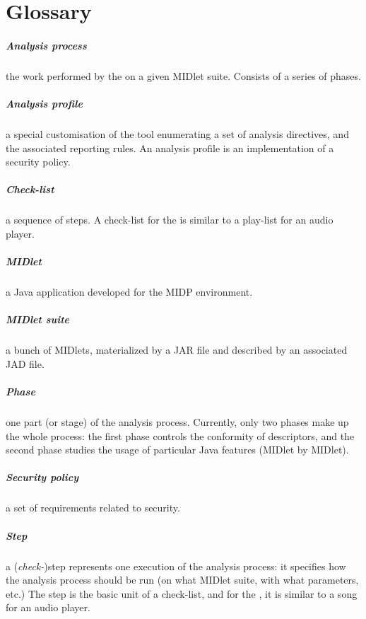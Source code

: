 \chapter*{Glossary}

\paragraph{Analysis process} the work performed by the \ma on a given
MIDlet suite. Consists of a series of phases.
\paragraph{Analysis profile} a special customisation of the tool
enumerating a set of analysis directives, and the associated reporting
rules. An analysis profile is an implementation of a security policy.
\paragraph{Check-list} a sequence of steps.  A check-list for the \ma
is similar to a play-list for an audio player. 
\paragraph{MIDlet} a Java application developed for the MIDP environment.
\paragraph{MIDlet suite} a bunch of MIDlets, materialized by a JAR
file and described by an associated JAD file.
\paragraph{Phase} one part (or stage) of the analysis
process. Currently, only two phases make up the whole process: the
first phase controls the conformity of descriptors, and the second
phase studies the usage of particular Java features (MIDlet by MIDlet).
\paragraph{Security policy} a set of requirements related to security.
\paragraph{Step} a (\emph{check-})step represents one execution of the
analysis process: it specifies how the analysis process
should be run (on what MIDlet suite, with what parameters, etc.) The
step is the basic unit of a check-list, and for the \ma, it is similar
to a song for an audio player.

